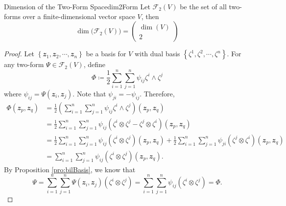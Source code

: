 \documentclass[math, code]{amznotes}
\theoremstyle{remark}
\begin{document}
\begin{probox}{Dimension of the Two-Form Space}{dim2Form}
    Let $\mathcal{F}_2(V)$ be the set of all two-forms over a finite-dimensional vector space $V$, then 
    \begin{equation*}
        \dim\bigl(\mathcal{F}_2(V)\bigr) = \begin{pmatrix}
            \dim(V) \\ 
            2
        \end{pmatrix}
    \end{equation*}
    \tcblower
    \begin{proof}
        Let $\left\{\mathbfit{z}_1, \mathbfit{z}_2, \cdots, \mathbfit{z}_n\right\}$ be a basis for $V$ with dual basis $\left\{\zeta^1, \zeta^2, \cdots, \zeta^n\right\}$. For any two-form $\Psi \in \mathcal{F}_2(V)$, define
        \begin{equation*}
            \Phi \coloneqq \frac{1}{2}\sum_{i = 1}^{n}\sum_{j = 1}^{n}\psi_{ij}\zeta^i\wedge\zeta^j
        \end{equation*}
        where $\psi_{ij} = \Psi\left(\mathbfit{z}_i, \mathbfit{z}_j\right)$. Note that $\psi_{ji} = -\psi_{ij}$. Therefore, 
        \begin{align*}
            \Phi\left(\mathbfit{z}_p, \mathbfit{z}_q\right) & = \frac{1}{2}\left(\sum_{i = 1}^{n}\sum_{j = 1}^{n}\psi_{ij}\zeta^i\wedge\zeta^j\right)\left(\mathbfit{z}_p, \mathbfit{z}_q\right) \\
            & = \frac{1}{2}\sum_{i = 1}^{n}\sum_{j = 1}^{n}\psi_{ij}\left(\zeta^i\otimes\zeta^j - \zeta^j\otimes\zeta^i\right)\left(\mathbfit{z}_p, \mathbfit{z}_q\right) \\
            & = \frac{1}{2}\sum_{i = 1}^{n}\sum_{j = 1}^{n}\psi_{ij}\left(\zeta^i\otimes\zeta^j\right)\left(\mathbfit{z}_p, \mathbfit{z}_q\right) + \frac{1}{2}\sum_{i = 1}^{n}\sum_{j = 1}^{n}\psi_{ji}\left(\zeta^j\otimes\zeta^i\right)\left(\mathbfit{z}_p, \mathbfit{z}_q\right) \\
            & = \sum_{i = 1}^{n}\sum_{j = 1}^{n}\psi_{ij}\left(\zeta^i\otimes\zeta^j\right)\left(\mathbfit{z}_p, \mathbfit{z}_q\right).
        \end{align*}
        By Proposition \ref{pro:bilBasis}, we know that 
        \begin{equation*}
            \Psi = \sum_{i = 1}^{n}\sum_{j = 1}^{n}\Psi\left(\mathbfit{z}_i, \mathbfit{z}_j\right)\left(\zeta^i\otimes\zeta^j\right) = \sum_{i = 1}^{n}\sum_{j = 1}^{n}\psi_{ij}\left(\zeta^i\otimes\zeta^j\right) = \Phi.
        \end{equation*}

\end{proof}
\end{probox}
\end{document}
